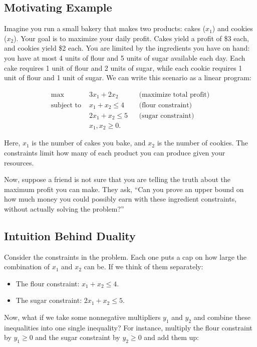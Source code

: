 \subsection*{Motivating Example}

Imagine you run a small bakery that makes two products: cakes ($x_1$) and cookies ($x_2$). Your goal is to maximize your daily profit. Cakes yield a profit of \$3 each, and cookies yield \$2 each. You are limited by the ingredients you have on hand: you have at most 4 units of flour and 5 units of sugar available each day. Each cake requires 1 unit of flour and 2 units of sugar, while each cookie requires 1 unit of flour and 1 unit of sugar. We can write this scenario as a linear program:

\[
\begin{aligned}
\max \; & 3x_1 + 2x_2 && \text{(maximize total profit)}\\
\text{subject to } & x_1 + x_2 \leq 4 && \text{(flour constraint)}\\
& 2x_1 + x_2 \leq 5 && \text{(sugar constraint)}\\
& x_1, x_2 \geq 0.
\end{aligned}
\]

Here, $x_1$ is the number of cakes you bake, and $x_2$ is the number of cookies. The constraints limit how many of each product you can produce given your resources.

Now, suppose a friend is not sure that you are telling the truth about the maximum profit you can make. They ask, ``Can you prove an upper bound on how much money you could possibly earn with these ingredient constraints, without actually solving the problem?''

\subsection*{Intuition Behind Duality}

Consider the constraints in the problem. Each one puts a cap on how large the combination of $x_1$ and $x_2$ can be. If we think of them separately:

\begin{itemize}
\item The flour constraint: $x_1 + x_2 \leq 4$.
\item The sugar constraint: $2x_1 + x_2 \leq 5$.
\end{itemize}
Now, what if we take some nonnegative multipliers $y_1$ and $y_2$ and combine these inequalities into one single inequality? For instance, multiply the flour constraint by $y_1 \geq 0$ and the sugar constraint by $y_2 \geq 0$ and add them up:

